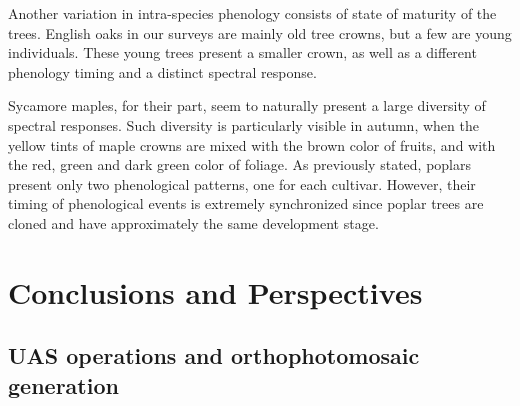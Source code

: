 \documentclass[remotesensing,article,submit,moreauthors,pdftex,12pt,a4paper]{mdpi} %
\begin{document}
Another variation in intra-species phenology consists of state of maturity of the trees.
English oaks in our surveys are mainly old tree crowns, but a few are young individuals. 
These young trees present a smaller crown, as well as a different phenology timing and a distinct spectral response. 

Sycamore maples, for their part, seem to naturally present a large diversity of spectral responses. 
Such diversity is particularly visible in autumn, when the yellow tints of maple crowns are mixed with the brown color of fruits, and with the red, green and dark green color of foliage. 
As previously stated, poplars present only two phenological patterns, one for each cultivar.
However, their timing of phenological events is extremely synchronized since poplar trees are cloned and have approximately the same development stage.

\section{Conclusions and Perspectives}

\subsection{UAS operations and orthophotomosaic generation}
\end{document}

